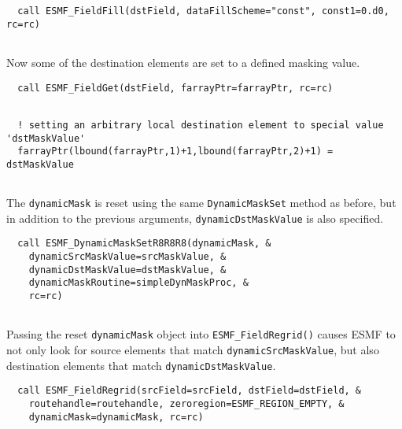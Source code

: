  \begin{verbatim}
  call ESMF_FieldFill(dstField, dataFillScheme="const", const1=0.d0, rc=rc)
 
\end{verbatim}
 

   Now some of the destination elements are set to a defined masking value. 

 \begin{verbatim}
  call ESMF_FieldGet(dstField, farrayPtr=farrayPtr, rc=rc)
 
\end{verbatim}
 

 \begin{verbatim}
  ! setting an arbitrary local destination element to special value 'dstMaskValue'
  farrayPtr(lbound(farrayPtr,1)+1,lbound(farrayPtr,2)+1) = dstMaskValue
 
\end{verbatim}
 

   The {\tt dynamicMask} is reset using the same {\tt DynamicMaskSet} method as
   before, but in addition to the previous arguments, {\tt dynamicDstMaskValue}
   is also specified. 

 \begin{verbatim}
  call ESMF_DynamicMaskSetR8R8R8(dynamicMask, &
    dynamicSrcMaskValue=srcMaskValue, &
    dynamicDstMaskValue=dstMaskValue, &
    dynamicMaskRoutine=simpleDynMaskProc, &
    rc=rc)
 
\end{verbatim}
 

   Passing the reset {\tt dynamicMask} object into {\tt ESMF\_FieldRegrid()} 
   causes ESMF to not only look for source elements that match
   {\tt dynamicSrcMaskValue}, but also destination elements that
   match {\tt dynamicDstMaskValue}. 

 \begin{verbatim}
  call ESMF_FieldRegrid(srcField=srcField, dstField=dstField, &
    routehandle=routehandle, zeroregion=ESMF_REGION_EMPTY, &
    dynamicMask=dynamicMask, rc=rc)
 
\end{verbatim}
 
